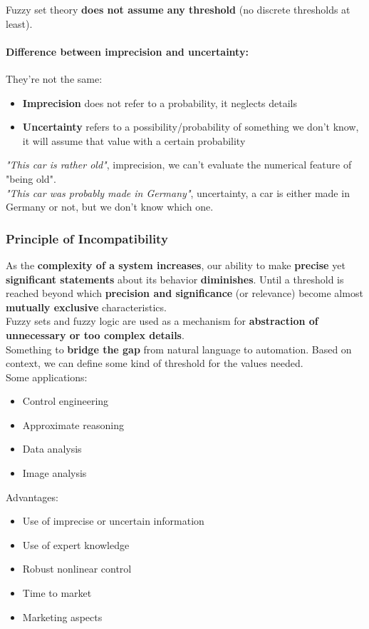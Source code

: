 \documentclass[11pt]{article}
\begin{document}
		Fuzzy set theory \textbf{does not assume any threshold} (no discrete thresholds at least).\\
		
		\newpage
		
		\paragraph{Difference between imprecision and uncertainty:} They're not the same: 
		\begin{itemize}
			\item \textbf{Imprecision} does not refer to a probability, it neglects details 
			\item \textbf{Uncertainty} refers to a possibility/probability of something we don't know, it will assume that value with a certain probability
		\end{itemize}
		
		\textit{"This car is rather old"}, imprecision, we can't evaluate the numerical feature of "being old".\\
		\textit{"This car was probably made in Germany"}, uncertainty, a car is either made in Germany or not, but we don't know which one.\\
		
		\subsubsection{Principle of Incompatibility}
		As the \textbf{complexity of a system increases}, our ability to make \textbf{precise} yet \textbf{significant statements} about its behavior \textbf{diminishes}. Until a threshold is reached beyond which \textbf{precision and significance} (or relevance) become almost \textbf{mutually exclusive} characteristics.\\
		
		Fuzzy sets and fuzzy logic are used as a mechanism for \textbf{abstraction of unnecessary or too complex details}.\\
		
		Something to \textbf{bridge the gap} from natural language to automation. Based on context, we can define some kind of threshold for the values needed.\\
		
		Some applications: 
		\begin{itemize}
			\item Control engineering 
			\item Approximate reasoning
			\item Data analysis 
			\item Image analysis
		\end{itemize}
		Advantages: 
		\begin{itemize}
			\item Use of imprecise or uncertain information
			\item Use of expert knowledge 
			\item Robust nonlinear control 
			\item Time to market 
			\item Marketing aspects 
		\end{itemize}
		
\end{document}
